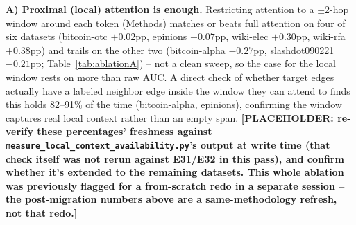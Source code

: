 \documentclass[letterpaper]{article} %
\newcommand{\ph}[1]{\textbf{[#1]}}  %
\theoremstyle{plain}
\theoremstyle{definition}
\begin{document}
\begin{table}[t!]
\centering
\scriptsize
{}
\caption{Ablation A: test AUC, full attention vs.\ local attention (same underlying numbers as Table~\ref{tab:result1}). $\Delta$ = local attention $-$ full attention, in percentage points.}
\label{tab:ablationA}
\end{table}

\textbf{A) Proximal (local) attention is enough.} Restricting attention to a $\pm$2-hop window around each token (Methods) matches or beats full attention on four of six datasets (bitcoin-otc $+0.02$pp, epinions $+0.07$pp, wiki-elec $+0.30$pp, wiki-rfa $+0.38$pp) and trails on the other two (bitcoin-alpha $-0.27$pp, slashdot090221 $-0.21$pp; Table~\ref{tab:ablationA}) -- not a clean sweep, so the case for the local window rests on more than raw AUC. A direct check of whether target edges actually have a labeled neighbor edge inside the window they can attend to finds this holds 82--91\% of the time (bitcoin-alpha, epinions), confirming the window captures real local context rather than an empty span. \ph{PLACEHOLDER: re-verify these percentages' freshness against \texttt{measure\_local\_context\_availability.py}'s output at write time (that check itself was not rerun against E31/E32 in this pass), and confirm whether it's extended to the remaining datasets. This whole ablation was previously flagged for a from-scratch redo in a separate session -- the post-migration numbers above are a same-methodology refresh, not that redo.}
\end{document}
